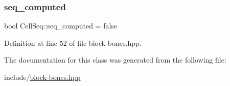 \subsubsection{\texorpdfstring{seq\+\_\+computed}{seq\_computed}}
{\footnotesize\ttfamily bool Cell\+Seq\+::seq\+\_\+computed = false\hspace{0.3cm}{\ttfamily [protected]}}



Definition at line 52 of file block-\/bones.\+hpp.



The documentation for this class was generated from the following file\+:\begin{DoxyCompactItemize}
\item 
include/\hyperlink{block-bones_8hpp}{block-\/bones.\+hpp}\end{DoxyCompactItemize}
